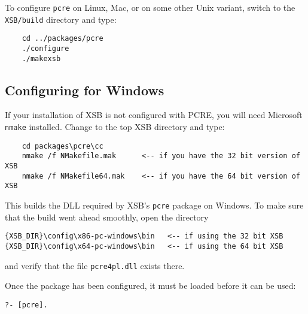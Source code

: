 To configure {\tt pcre} on Linux, Mac, or on some other Unix variant,
switch to the {\tt XSB/build} directory and type:

\begin{verbatim}
    cd ../packages/pcre
    ./configure
    ./makexsb
\end{verbatim}


\subsection{Configuring for Windows}

If your installation of XSB is not configured with PCRE,
you will need Microsoft \texttt{nmake} installed. 
Change to the top XSB directory and type:
\begin{verbatim}
    cd packages\pcre\cc
    nmake /f NMakefile.mak      <-- if you have the 32 bit version of XSB
    nmake /f NMakefile64.mak    <-- if you have the 64 bit version of XSB
\end{verbatim}
This builds the DLL required by XSB's {\tt pcre} package on Windows. To
make sure that the build went ahead smoothly, open the directory
\begin{verbatim}
{XSB_DIR}\config\x86-pc-windows\bin   <-- if using the 32 bit XSB
{XSB_DIR}\config\x64-pc-windows\bin   <-- if using the 64 bit XSB
\end{verbatim}
and verify that the file {\tt pcre4pl.dll} exists there.

Once the package has been configured, it must be loaded before it can be used:
\begin{verbatim}
?- [pcre].
\end{verbatim}



